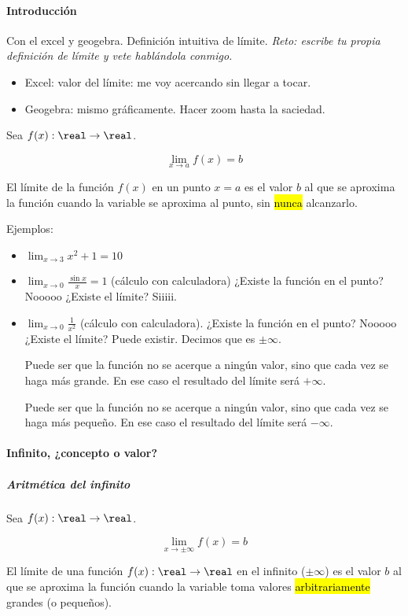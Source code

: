 \paragraph{Introducción}

Con el excel y geogebra. Definición intuitiva de límite. \textit{Reto: escribe tu propia definición de límite y vete hablándola conmigo.}

\begin{itemize}
	\item Excel: valor del límite: me voy acercando sin llegar a tocar.
	\item Geogebra: mismo gráficamente. Hacer zoom hasta la saciedad.
\end{itemize}

\begin{defn}
Sea $f(x):\real\to\real$.

\[\lim_{x\to a} f(x) = b\]

El límite de la función $f(x)$ en un punto $x=a$ es el valor $b$ al que se aproxima la función cuando la variable se aproxima al punto, sin \hl{nunca} alcanzarlo.
\end{defn}

Ejemplos:
\begin{itemize}
	\item $\lim_{x\to 3} x^2 + 1 = 10$
	\item $\lim_{x\to 0} \frac{\sin x}{x} = 1$ (cálculo con calculadora) ¿Existe la función en el punto? Nooooo ¿Existe el límite? Siiiii.
	\item $\lim_{x\to 0} \frac{1}{x^2}$ (cálculo con calculadora). ¿Existe la función en el punto? Nooooo ¿Existe el límite? Puede existir. Decimos que es $\pm\infty$.

\obs Puede ser que la función no se acerque a ningún valor, sino que cada vez se haga más grande. En ese caso el resultado del límite será $+\infty$.

\obs Puede ser que la función no se acerque a ningún valor, sino que cada vez se haga más pequeño. En ese caso el resultado del límite será $-\infty$.
\end{itemize}


\paragraph{Infinito, ¿concepto o valor?}

\subparagraph{Aritmética del infinito}

\begin{defn}
Sea $f(x):\real\to\real$.

\[\lim_{x\to \pm\infty} f(x) = b\]

El límite de una función $f(x):\real\to\real$ en el infinito ($\pm\infty$) es el valor $b$ al que se aproxima la función cuando la variable toma valores \hl{arbitrariamente} grandes (o pequeños).
\end{defn}

